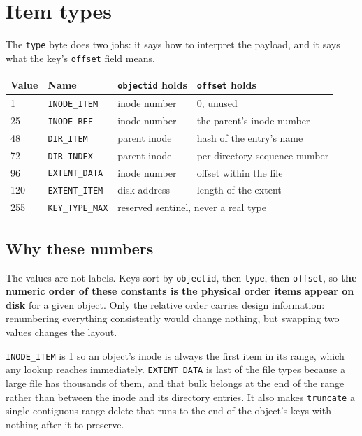 
\section{Item types}
\label{sec:item-types}

The \texttt{type} byte does two jobs: it says how to interpret the payload, and
it says what the key's \texttt{offset} field means.

\begin{center}
\begin{tabular}{llll}
  \toprule
  Value & Name & \texttt{objectid} holds & \texttt{offset} holds \\
  \midrule
  1   & \texttt{INODE\_ITEM}   & inode number  & 0, unused \\
  25  & \texttt{INODE\_REF}    & inode number  & the parent's inode number \\
  48  & \texttt{DIR\_ITEM}     & parent inode  & hash of the entry's name \\
  72  & \texttt{DIR\_INDEX}    & parent inode  & per-directory sequence number \\
  96  & \texttt{EXTENT\_DATA}  & inode number  & offset within the file \\
  120 & \texttt{EXTENT\_ITEM}  & disk address  & length of the extent \\
  255 & \texttt{KEY\_TYPE\_MAX} & \multicolumn{2}{l}{reserved sentinel, never a real type} \\
  \bottomrule
\end{tabular}
\end{center}

\subsection{Why these numbers}

The values are not labels. Keys sort by \texttt{objectid}, then \texttt{type},
then \texttt{offset}, so \textbf{the numeric order of these constants is the
physical order items appear on disk} for a given object. Only the relative
order carries design information: renumbering everything consistently would
change nothing, but swapping two values changes the layout.

\texttt{INODE\_ITEM} is 1 so an object's inode is always the first item in its
range, which any lookup reaches immediately. \texttt{EXTENT\_DATA} is last of
the file types because a large file has thousands of them, and that bulk
belongs at the end of the range rather than between the inode and its directory
entries. It also makes \texttt{truncate} a single contiguous range delete that
runs to the end of the object's keys with nothing after it to preserve.

